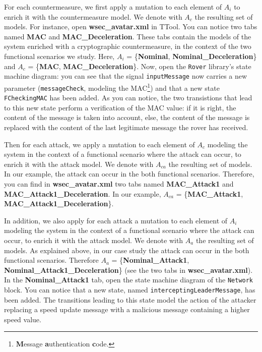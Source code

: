 \documentclass{article}
\begin{document}
For each countermeasure, we first apply a mutation to each element of $A_i$ to enrich it with the countermeasure model. We denote with $A_c$ the resulting set of models. For instance, open \textbf{wsec\_avatar.xml} in TTool. You can notice two tabs named \textbf{MAC} and \textbf{MAC\_Deceleration}. These tabs contain the models of the system enriched with a cryptographic countermeasure, in the context of the two functional scenarios we study. Here, $A_i$ = \{\textbf{Nominal}, \textbf{Nominal\_Deceleration}\} and $A_c$ = \{\textbf{MAC}, \textbf{MAC\_Deceleration}\}. Now, open the \texttt{Rover} library's state machine diagram: you can see that the signal \texttt{inputMessage} now carries a new parameter (\texttt{messageCheck}, modeling the MAC\footnote{\textbf{M}essage \textbf{a}uthentication \textbf{c}ode.}) and that a new state \texttt{FCheckingMAC} has been added. As you can notice, the two transistions that lead to this new state perform a verification of the MAC value: if it is right, the content of the message is taken into account, else, the content of the message is replaced with the content of the last legitimate message the rover has received.

Then for each attack, we apply a mutation to each element of $A_c$ modeling the system in the context of a functional scenario where the attack can occur, to enrich it with the attack model. We denote with $A_{c a}$ the resulting set of models. In our example, the attack can occur in the both functional scenarios. Therefore, you can find in \textbf{wsec\_avatar.xml} two tabs named \textbf{MAC\_Attack1} and \textbf{MAC\_Attack1\_Deceleration}. In our example, $A_{c a}$ = \{\textbf{MAC\_Attack1}, \textbf{MAC\_Attack1\_Deceleration}\}.

In addition, we also apply for each attack a mutation to each element of $A_i$ modeling the system in the context of a functional scenario where the attack can occur, to enrich it with the attack model. We denote with $A_a$ the resulting set of models. As explained above, in our case study the attack can occur in the both functional scenarios. Therefore $A_a$ = \{\textbf{Nominal\_Attack1}, \textbf{Nominal\_Attack1\_Deceleration}\} (see the two tabs in \textbf{wsec\_avatar.xml}). In the \textbf{Nominal\_Attack1} tab, open the state machine diagram of the \texttt{Network} block. You can notice that a new state, named \texttt{interceptingLeaderMessage}, has been added. The transitions leading to this state model the action of the attacker replacing a speed update message with a malicious message containing a higher speed value.
\end{document}
